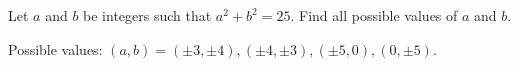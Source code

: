 \question Let $a$ and $b$ be integers such that $a^2 + b^2 = 25$. Find all possible values of $a$ and $b$.
\begin{solution}
Possible values: $(a,b) = (\pm 3, \pm 4), (\pm 4, \pm 3), (\pm 5, 0), (0, \pm 5)$.
\end{solution}
